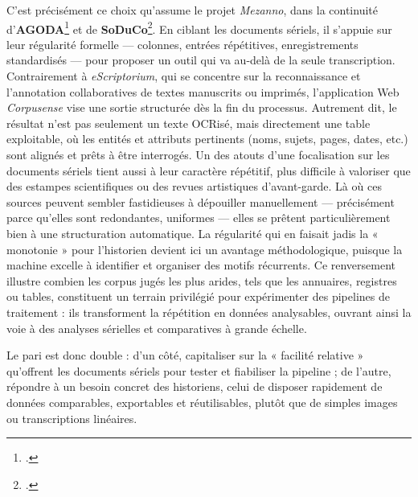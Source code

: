 C’est précisément ce choix qu’assume le projet \emph{Mezanno}, dans la continuité d’\textbf{AGODA}\footcite[][]{fanny} et de \textbf{SoDuCo}\footcite[][]{soduco}. En ciblant les documents sériels, il s’appuie sur leur régularité formelle — colonnes, entrées répétitives, enregistrements standardisés — pour proposer un outil qui va au-delà de la seule transcription. Contrairement à \emph{eScriptorium}, qui se concentre sur la reconnaissance et l’annotation collaboratives de textes manuscrits ou imprimés, l'application Web \emph{Corpusense} vise une sortie structurée dès la fin du processus. Autrement dit, le résultat n’est pas seulement un texte OCRisé, mais directement une table exploitable, où les entités et attributs pertinents (noms, sujets, pages, dates, etc.) sont alignés et prêts à être interrogés. Un des atouts d’une focalisation sur les documents sériels tient aussi à leur caractère répétitif, plus difficile à valoriser que des estampes scientifiques ou des revues artistiques d'avant-garde. Là où ces sources peuvent sembler fastidieuses à dépouiller manuellement — précisément parce qu’elles sont redondantes, uniformes — elles se prêtent particulièrement bien à une structuration automatique. La régularité qui en faisait jadis la « monotonie » pour l’historien devient ici un avantage méthodologique, puisque la machine excelle à identifier et organiser des motifs récurrents. Ce renversement illustre combien les corpus jugés les plus arides, tels que les annuaires, registres ou tables, constituent un terrain privilégié pour expérimenter des pipelines de traitement : ils transforment la répétition en données analysables, ouvrant ainsi la voie à des analyses sérielles et comparatives à grande échelle.

Le pari est donc double : d’un côté, capitaliser sur la « facilité relative » qu’offrent les documents sériels pour tester et fiabiliser la pipeline ; de l’autre, répondre à un besoin concret des historiens, celui de disposer rapidement de données comparables, exportables et réutilisables, plutôt que de simples images ou transcriptions linéaires. 
